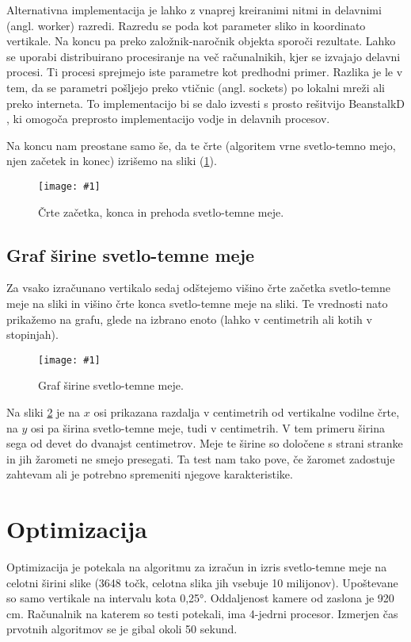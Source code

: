 \documentclass[oneside, a4paper, 12pt]{book}
\newcommand{\slika}[3]{
	\begin{figure}
	\begin{center}
	\texttt{[image: \#1]}
	\end{center}
	\vspace{-20pt}
	\caption{#2}
	\label{#3}
	\end{figure}
}
\begin{document}
Alternativna implementacija je lahko z vnaprej kreiranimi nitmi in delavnimi (angl. worker) razredi. Razredu se poda kot parameter sliko in koordinato vertikale. Na koncu pa preko založnik-naročnik objekta sporoči rezultate. Lahko se uporabi distribuirano procesiranje na več računalnikih, kjer se izvajajo delavni procesi. Ti procesi sprejmejo iste parametre kot predhodni primer. Razlika je le v tem, da se parametri pošljejo preko vtičnic (angl. sockets) po lokalni mreži ali preko interneta. To implementacijo bi se dalo izvesti s prosto rešitvijo BeanstalkD \cite{beanstalkd}, ki omogoča preprosto implementacijo vodje in delavnih procesov.

Na koncu nam preostane samo še, da te črte (algoritem vrne svetlo-temno mejo, njen začetek in konec) izrišemo na sliki (\ref{pic:svet-tem3}). 



\slika{slike/svetlo-temna-meja-po-celi-sirini.jpg}{Črte začetka, konca in prehoda svetlo-temne meje.}{pic:svet-tem3}

\subsection{Graf širine svetlo-temne meje}
Za vsako izračunano vertikalo sedaj odštejemo višino črte začetka svetlo-temne meje na sliki in višino črte konca svetlo-temne meje na sliki. Te vrednosti nato prikažemo na grafu, glede na izbrano enoto (lahko v centimetrih ali kotih v stopinjah).

\slika{slike/graf-sirina-s-t-meja-crop.jpg}{Graf širine svetlo-temne meje.}{pic:st-sirina}


Na sliki \ref{pic:st-sirina} je na $x$ osi prikazana razdalja v centimetrih od vertikalne vodilne črte, na $y$ osi pa širina svetlo-temne meje, tudi v centimetrih. V tem primeru širina sega od devet do dvanajst centimetrov. Meje te širine so določene s strani stranke in jih žarometi ne smejo presegati. Ta test nam tako pove, če žaromet zadostuje zahtevam ali je potrebno spremeniti njegove karakteristike.


\section{Optimizacija}
Optimizacija je potekala na algoritmu za izračun in izris svetlo-temne meje na celotni širini slike (3648 točk, celotna slika jih vsebuje 10 milijonov). Upoštevane so samo vertikale na intervalu kota 0,25°. Oddaljenost kamere od zaslona je 920 cm. Računalnik na katerem so testi potekali, ima 4-jedrni procesor. Izmerjen čas prvotnih algoritmov se je gibal okoli 50 sekund.
\end{document}
